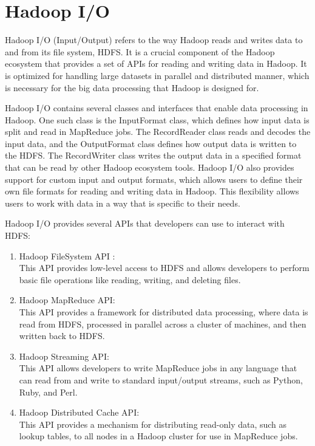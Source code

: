 \documentclass[12pt]{article}
\begin{document}
\section{Hadoop I/O}
Hadoop I/O (Input/Output) refers to the way Hadoop reads and writes data to and from its file system, HDFS. It is a crucial component of the Hadoop ecosystem that provides a set of APIs for reading and writing data in Hadoop. It is optimized for handling large datasets in parallel and distributed manner, which is necessary for the big data processing that Hadoop is designed for.

Hadoop I/O contains several classes and interfaces that enable data processing in Hadoop. One such class is the InputFormat class, which defines how input data is split and read in MapReduce jobs. The RecordReader class reads and decodes the input data, and the OutputFormat class defines how output data is written to the HDFS. The RecordWriter class writes the output data in a specified format that can be read by other Hadoop ecosystem tools. Hadoop I/O also provides support for custom input and output formats, which allows users to define their own file formats for reading and writing data in Hadoop. This flexibility allows users to work with data in a way that is specific to their needs.

Hadoop I/O provides several APIs that developers can use to interact with HDFS:
\begin{enumerate}
    \item Hadoop FileSystem API : \\
    This API provides low-level access to HDFS and allows developers to perform basic file operations like reading, writing, and deleting files.
    \item Hadoop MapReduce API: \\
    This API provides a framework for distributed data processing, where data is read from HDFS, processed in parallel across a cluster of machines, and then written back to HDFS.
    \item Hadoop Streaming API: \\
    This API allows developers to write MapReduce jobs in any language that can read from and write to standard input/output streams, such as Python, Ruby, and Perl.
    \item Hadoop Distributed Cache API: \\
    This API provides a mechanism for distributing read-only data, such as lookup tables, to all nodes in a Hadoop cluster for use in MapReduce jobs.
\end{enumerate}
\end{document}
